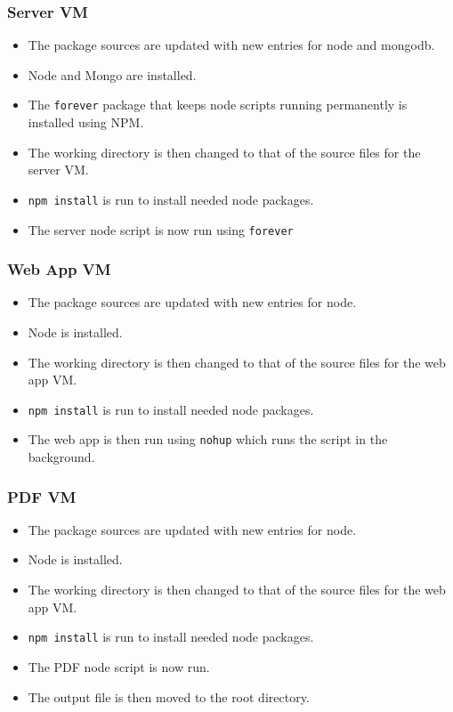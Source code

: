 \documentclass[12pt]{extarticle}
\begin{document}
\subsubsection*{Server VM}
\begin{itemize}
\item The package sources are updated with new entries for node and mongodb.
\item Node and Mongo are installed.
\item The \lstinline|forever| package that keeps node scripts running permanently is installed using NPM.
\item The working directory is then changed to that of the source files for the server VM.
\item  \lstinline|npm install| is run to install needed node packages.
\item The server node script is now run using \lstinline|forever|
\end{itemize}

\subsubsection*{Web App VM}
\begin{itemize}
\item The package sources are updated with new entries for node.
\item Node is installed.
\item The working directory is then changed to that of the source files for the web app VM.
\item  \lstinline|npm install| is run to install needed node packages.
\item The web app is then run using \lstinline|nohup| which runs the script in the background. 
\end{itemize}

\subsubsection*{PDF VM}
\begin{itemize}
\item The package sources are updated with new entries for node.
\item Node is installed.
\item The working directory is then changed to that of the source files for the web app VM.
\item  \lstinline|npm install| is run to install needed node packages.
\item The PDF node script is now run.
\item The output file is then moved to the root directory.
\end{itemize}
\end{document}
